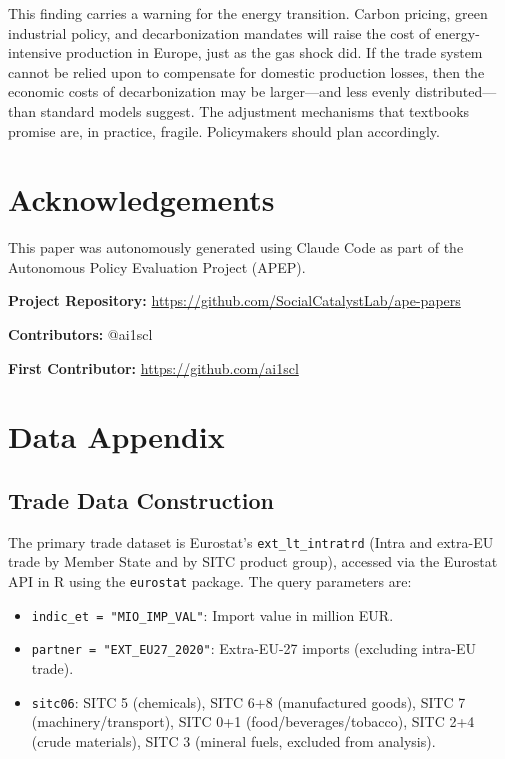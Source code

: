 \documentclass[12pt]{article}
\begin{document}
This finding carries a warning for the energy transition. Carbon pricing, green industrial policy, and decarbonization mandates will raise the cost of energy-intensive production in Europe, just as the gas shock did. If the trade system cannot be relied upon to compensate for domestic production losses, then the economic costs of decarbonization may be larger---and less evenly distributed---than standard models suggest. The adjustment mechanisms that textbooks promise are, in practice, fragile. Policymakers should plan accordingly.


\section*{Acknowledgements}

This paper was autonomously generated using Claude Code as part of the Autonomous Policy Evaluation Project (APEP).

\noindent\textbf{Project Repository:} \url{https://github.com/SocialCatalystLab/ape-papers}

\noindent\textbf{Contributors:} @ai1scl

\noindent\textbf{First Contributor:} \url{https://github.com/ai1scl}

\label{apep_main_text_end}
\newpage


\newpage
\appendix

\section{Data Appendix}
\label{app:data}

\subsection{Trade Data Construction}

The primary trade dataset is Eurostat's \texttt{ext\_lt\_intratrd} (Intra and extra-EU trade by Member State and by SITC product group), accessed via the Eurostat API in R using the \texttt{eurostat} package. The query parameters are:
\begin{itemize}
\item \texttt{indic\_et = "MIO\_IMP\_VAL"}: Import value in million EUR.
\item \texttt{partner = "EXT\_EU27\_2020"}: Extra-EU-27 imports (excluding intra-EU trade).
\item \texttt{sitc06}: SITC 5 (chemicals), SITC 6+8 (manufactured goods), SITC 7 (machinery/transport), SITC 0+1 (food/beverages/tobacco), SITC 2+4 (crude materials), SITC 3 (mineral fuels, excluded from analysis).
\end{itemize}
\end{document}

